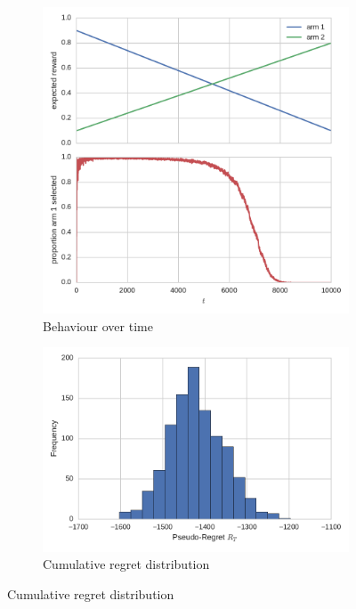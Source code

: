 \documentclass[11pt,a4paper,twoside]{report}
\theoremstyle{plain}
\theoremstyle{definition}
\begin{document}
\begin{figure}[ht]
    \begin{subfigure}[t]{0.49\textwidth}
	\centering   
	 \caption{Behaviour over time}\label{fig:non-stationary-bandit-time} 
         \includegraphics[scale=.5]{non-stationary-bandit-time}
\end{subfigure}
    \begin{subfigure}[t]{0.49\textwidth}
    \centering
     \caption{Cumulative regret distribution}
        \label{fig:non-stationary-bandit-regret}
        \includegraphics[scale=.5]{non-stationary-bandit-regret}

\end{subfigure}
\end{figure}
\end{document}
